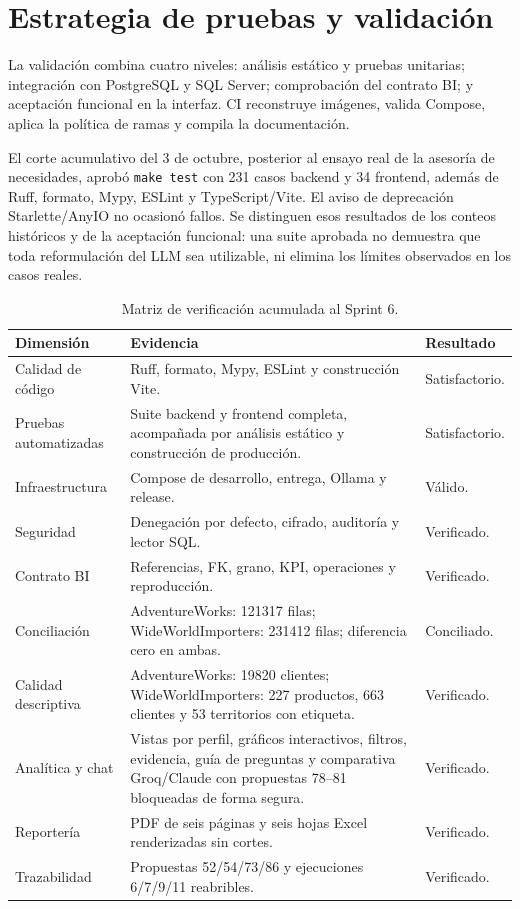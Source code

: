\documentclass[11pt,letterpaper]{article}
\newcommand{\file}[1]{\texttt{#1}}
\begin{document}
\section{Estrategia de pruebas y validación}

La validación combina cuatro niveles: análisis estático y pruebas unitarias; integración con PostgreSQL y SQL Server; comprobación del contrato BI; y aceptación funcional en la interfaz. CI reconstruye imágenes, valida Compose, aplica la política de ramas y compila la documentación.

El corte acumulativo del 3 de octubre, posterior al ensayo real de la asesoría de
necesidades, aprobó \file{make test} con 231 casos backend y 34 frontend, además de
Ruff, formato, Mypy, ESLint y TypeScript/Vite. El aviso de deprecación Starlette/AnyIO
no ocasionó fallos. Se distinguen esos resultados de los conteos históricos y de la
aceptación funcional: una suite aprobada no demuestra que toda reformulación del LLM
sea utilizable, ni elimina los límites observados en los casos reales.

\begin{table}[ht]
\centering
\caption{Matriz de verificación acumulada al Sprint 6.}
\begin{tabularx}{\textwidth}{@{}p{}p{}X@{}}
  \toprule
  Dimensión & Evidencia & Resultado \\
  \midrule
  Calidad de código & Ruff, formato, Mypy, ESLint y construcción Vite. & Satisfactorio. \\
  Pruebas automatizadas & Suite backend y frontend completa, acompañada por análisis estático y construcción de producción. & Satisfactorio. \\
  Infraestructura & Compose de desarrollo, entrega, Ollama y release. & Válido. \\
  Seguridad & Denegación por defecto, cifrado, auditoría y lector SQL. & Verificado. \\
  Contrato BI & Referencias, FK, grano, KPI, operaciones y reproducción. & Verificado. \\
  Conciliación & AdventureWorks: 121317 filas; WideWorldImporters: 231412 filas; diferencia cero en ambas. & Conciliado. \\
  Calidad descriptiva & AdventureWorks: 19820 clientes; WideWorldImporters: 227 productos, 663 clientes y 53 territorios con etiqueta. & Verificado. \\
  Analítica y chat & Vistas por perfil, gráficos interactivos, filtros, evidencia, guía de preguntas y comparativa Groq/Claude con propuestas 78--81 bloqueadas de forma segura. & Verificado. \\
  Reportería & PDF de seis páginas y seis hojas Excel renderizadas sin cortes. & Verificado. \\
  Trazabilidad & Propuestas 52/54/73/86 y ejecuciones 6/7/9/11 reabribles. & Verificado. \\
  \bottomrule
\end{tabularx}
\end{table}
\end{document}
